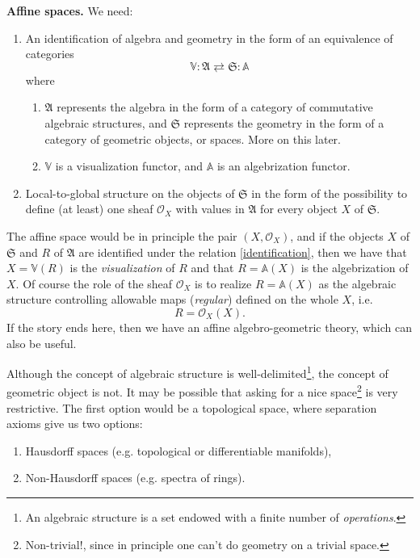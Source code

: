 \documentclass{article}
\begin{document}
\par\noindent
{\bf Affine spaces.} We need:
\begin{enumerate}
\item An identification of algebra and geometry in the form  of an equivalence of categories 
\begin{equation}
\label{identification}
\mathbb{V}:\mathfrak{A}\rightleftarrows\mathfrak{S}:\mathbb{A}
\end{equation}
where 
\begin{enumerate}
\item $\mathfrak{A}$ represents the algebra in the form of a category of commutative algebraic structures, and $\mathfrak{S}$ represents the geometry in the form of a category of geometric objects, or spaces. More on this later.
\item $\mathbb{V}$ is a visualization functor, and $\mathbb{A}$ is an algebrization functor.
\end{enumerate}
\item Local-to-global structure on the objects of $\mathfrak{S}$ in the form of the possibility to define (at least) one sheaf $\mathcal{O}_X$ with values in $\mathfrak{A}$ for every object $X$ of  $\mathfrak{S}$.
\end{enumerate}
The affine space would be in principle the pair $(X, \mathcal{O}_X)$, and if the objects $X$ of $\mathfrak{S}$ and $R$ of $\mathfrak{A}$ are identified under the relation \eqref{identification}, then we have that  $X=\mathbb{V}(R)$ is the {\it visualization} of $R$ and that $R=\mathbb{A}(X)$ is the algebrization of $X$. Of course the role of the sheaf $\mathcal{O}_X$ is to realize $R=\mathbb{A}(X)$ as the algebraic structure controlling allowable maps ({\it regular})  defined on the whole $X$, i.e. 
\begin{equation}
R=\mathcal{O}_X(X).
\end{equation}
If the story  ends here, then we have an affine algebro-geometric theory, which can also be useful.

Although the concept of algebraic structure is well-delimited\footnote{An algebraic structure is a set endowed with a finite number of {\it operations}.}, the concept of geometric object is not. It may be possible that asking for a nice  space\footnote{Non-trivial!, since in principle one can't do geometry on a trivial space.} is very restrictive. The first option would be a topological space, where separation axioms give us two options:
\begin{enumerate}
\item Hausdorff spaces (e.g. topological or differentiable manifolds),
\item Non-Hausdorff spaces (e.g. spectra of rings).
\end{enumerate}
\end{document}
